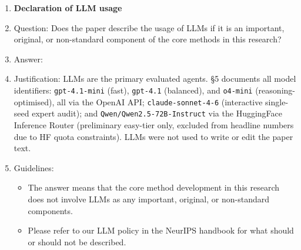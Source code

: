 \begin{enumerate}
\item {\bf Declaration of LLM usage}
    \item[] Question: Does the paper describe the usage of LLMs if it is an important, original, or non-standard component of the core methods in this research?
    \item[] Answer: \answerYes{}
    \item[] Justification: LLMs are the primary evaluated agents.  \S5 documents all model identifiers:
    \texttt{gpt-4.1-mini} (fast), \texttt{gpt-4.1} (balanced), and \texttt{o4-mini}
    (reasoning-optimised), all via the OpenAI API;
    \texttt{claude-sonnet-4-6} (interactive single-seed expert audit);
    and \texttt{Qwen/Qwen2.5-72B-Instruct} via the HuggingFace Inference Router
    (preliminary easy-tier only, excluded from headline numbers due to HF quota
    constraints).  LLMs were not used to write or edit the paper text.
    \item[] Guidelines: \begin{itemize}
        \item The answer \answerNA{} means that the core method development in this research does not involve LLMs as any important, original, or non-standard components.
        \item Please refer to our LLM policy in the NeurIPS handbook for what should or should not be described.
    \end{itemize}

\end{enumerate}
